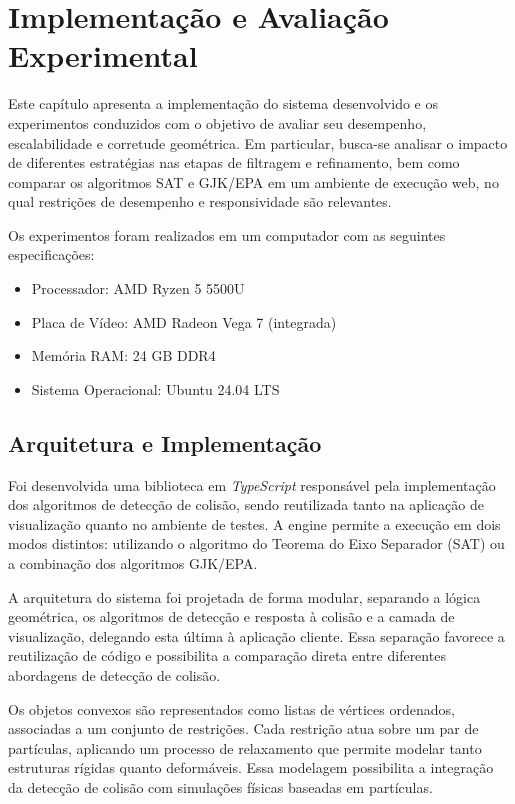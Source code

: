 \chapter{Implementação e Avaliação Experimental}

Este capítulo apresenta a implementação do sistema desenvolvido e os experimentos conduzidos com o objetivo de avaliar seu desempenho, escalabilidade e corretude geométrica. Em particular, busca-se analisar o impacto de diferentes estratégias nas etapas de filtragem e refinamento, bem como comparar os algoritmos SAT e GJK/EPA em um ambiente de execução web, no qual restrições de desempenho e responsividade são relevantes.

Os experimentos foram realizados em um computador com as seguintes especificações:
\begin{itemize}
	\item Processador: AMD Ryzen 5 5500U
	\item Placa de Vídeo: AMD Radeon Vega 7 (integrada)
	\item Memória RAM: 24 GB DDR4
	\item Sistema Operacional: Ubuntu 24.04 LTS
\end{itemize}

\section{Arquitetura e Implementação}

Foi desenvolvida uma biblioteca em \textit{TypeScript} responsável pela implementação dos algoritmos de detecção de colisão, sendo reutilizada tanto na aplicação de visualização quanto no ambiente de testes. A engine permite a execução em dois modos distintos: utilizando o algoritmo do Teorema do Eixo Separador (SAT) ou a combinação dos algoritmos GJK/EPA.

A arquitetura do sistema foi projetada de forma modular, separando a lógica geométrica, os algoritmos de detecção e resposta à colisão e a camada de visualização, delegando esta última à aplicação cliente. Essa separação favorece a reutilização de código e possibilita a comparação direta entre diferentes abordagens de detecção de colisão.

Os objetos convexos são representados como listas de vértices ordenados, associadas a um conjunto de restrições. Cada restrição atua sobre um par de partículas, aplicando um processo de relaxamento que permite modelar tanto estruturas rígidas quanto deformáveis. Essa modelagem possibilita a integração da detecção de colisão com simulações físicas baseadas em partículas. 

